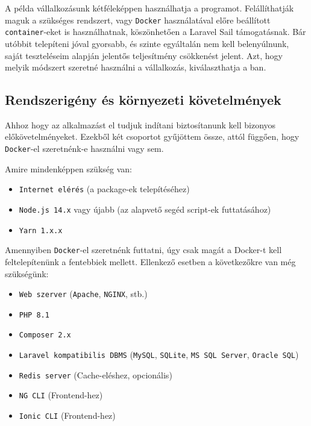 \documentclass[a4paper,12pt]{thesis-ekf}
\theoremstyle{definition}
\begin{document}
		A példa vállalkozásunk kétféleképpen használhatja a programot. Felállíthatják maguk a szükséges rendszert, vagy \verb|Docker| használatával előre beállított \verb|container|-eket is használhatnak, köszönhetően a Laravel Sail támogatásnak\cite{sail-intro}. Bár utóbbit telepíteni jóval gyorsabb, és szinte egyáltalán nem kell belenyúlnunk, saját teszteléseim alapján jelentős teljesítmény csökkenést jelent. Azt, hogy melyik módszert szeretné használni a vállalkozás, kiválaszthatja a ban.
		
		\subsection{Rendszerigény és környezeti követelmények}
		Ahhoz hogy az alkalmazást el tudjuk indítani biztosítanunk kell bizonyos előkövetelményeket. Ezekből két csoportot gyűjöttem össze, attól függően, hogy \verb|Docker|-el szeretnénk-e használni vagy sem.
		
		Amire mindenképpen szükség van:
		\begin{itemize}
          \item \verb|Internet elérés| (a package-ek telepítéséhez)
          \item \verb|Node.js 14.x| vagy újabb (az alapvető segéd script-ek futtatásához)
          \item \verb|Yarn 1.x.x|
        \end{itemize}
        
        Amennyiben \verb|Docker|-el szeretnénk futtatni, úgy csak magát a Docker-t kell feltelepítenünk a fentebbiek mellett. Ellenkező esetben a következőkre van még szükségünk:
        
        \begin{itemize}
            \item \verb|Web szerver| (\verb|Apache|, \verb|NGINX|, stb.)
            \item \verb|PHP 8.1|
            \item \verb|Composer 2.x|
            \item \verb|Laravel kompatibilis DBMS| (\verb|MySQL|, \verb|SQLite|, \verb|MS SQL Server|, \verb|Oracle SQL|)\cite{supported-dbms}
            \item \verb|Redis server| (Cache-eléshez, opcionális)
            \item \verb|NG CLI| (Frontend-hez)
            \item \verb|Ionic CLI| (Frontend-hez)
        \end{itemize}
		
\end{document}
